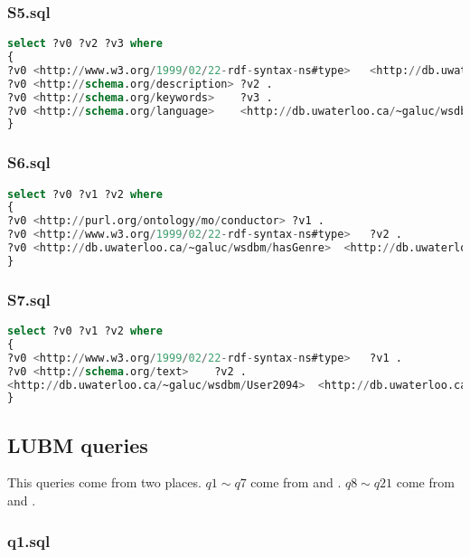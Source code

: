 \documentclass[titlepage, a4paper, 12pt] {article}
\begin{document}
\subsubsection{S5.sql}

\begin{lstlisting}[language=SQL]
select ?v0 ?v2 ?v3 where 
{
?v0	<http://www.w3.org/1999/02/22-rdf-syntax-ns#type>	<http://db.uwaterloo.ca/~galuc/wsdbm/ProductCategory3> . 
?v0	<http://schema.org/description>	?v2 . 
?v0	<http://schema.org/keywords>	?v3 . 
?v0	<http://schema.org/language>	<http://db.uwaterloo.ca/~galuc/wsdbm/Language0> . 
}
\end{lstlisting}

\subsubsection{S6.sql}

\begin{lstlisting}[language=SQL]
select ?v0 ?v1 ?v2 where 
{
?v0	<http://purl.org/ontology/mo/conductor>	?v1 . 
?v0	<http://www.w3.org/1999/02/22-rdf-syntax-ns#type>	?v2 . 
?v0	<http://db.uwaterloo.ca/~galuc/wsdbm/hasGenre>	<http://db.uwaterloo.ca/~galuc/wsdbm/SubGenre1> . 
}
\end{lstlisting}

\subsubsection{S7.sql}

\begin{lstlisting}[language=SQL]
select ?v0 ?v1 ?v2 where 
{
?v0	<http://www.w3.org/1999/02/22-rdf-syntax-ns#type>	?v1 . 
?v0	<http://schema.org/text>	?v2 . 
<http://db.uwaterloo.ca/~galuc/wsdbm/User2094>	<http://db.uwaterloo.ca/~galuc/wsdbm/likes>	?v0 .
}
\end{lstlisting}

\subsection{LUBM queries}\label{lubm}
This queries come from two places.
$q1 \sim q7$ come from \cite{Atre2010Matrix} and \cite{DBLP:journals/vldb/PengZO0Z16}.
$q8 \sim q21$ come from \cite{Guo2005LUBM} and \cite{Zou2014gStore}.

\subsubsection{q1.sql}
\end{document}
